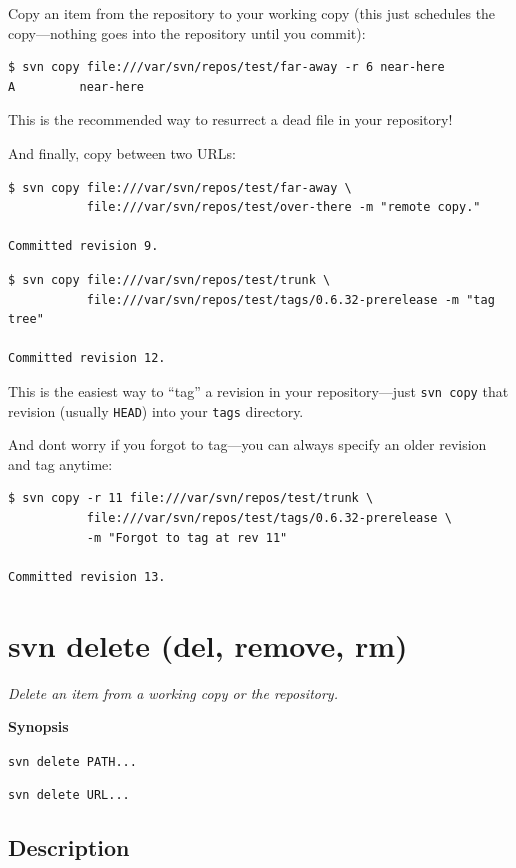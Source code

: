 Copy an item from the repository to your working copy (this just
schedules the copy---nothing goes into the repository until you commit):

\begin{verbatim}
$ svn copy file:///var/svn/repos/test/far-away -r 6 near-here
A         near-here
\end{verbatim}

This is the recommended way to resurrect a dead file in your repository!

And finally, copy between two URLs:

\begin{verbatim}
$ svn copy file:///var/svn/repos/test/far-away \
           file:///var/svn/repos/test/over-there -m "remote copy."

Committed revision 9.
\end{verbatim}

\begin{verbatim}
$ svn copy file:///var/svn/repos/test/trunk \
           file:///var/svn/repos/test/tags/0.6.32-prerelease -m "tag tree"

Committed revision 12.
\end{verbatim}

This is the easiest way to ``tag'' a revision in your repository---just
\texttt{svn\ copy} that revision (usually \texttt{HEAD}) into your
\texttt{tags} directory.

And don\textquotesingle t worry if you forgot to tag---you can always
specify an older revision and tag anytime:

\begin{verbatim}
$ svn copy -r 11 file:///var/svn/repos/test/trunk \
           file:///var/svn/repos/test/tags/0.6.32-prerelease \
           -m "Forgot to tag at rev 11"

Committed revision 13.
\end{verbatim}

\section{svn delete (del, remove, rm)}\label{svn.ref.svn.c.delete}

\emph{Delete an item from a working copy or the repository.}

\textbf{Synopsis}

\texttt{svn\ delete\ PATH...}

\texttt{svn\ delete\ URL...}

\subsection{Description}

